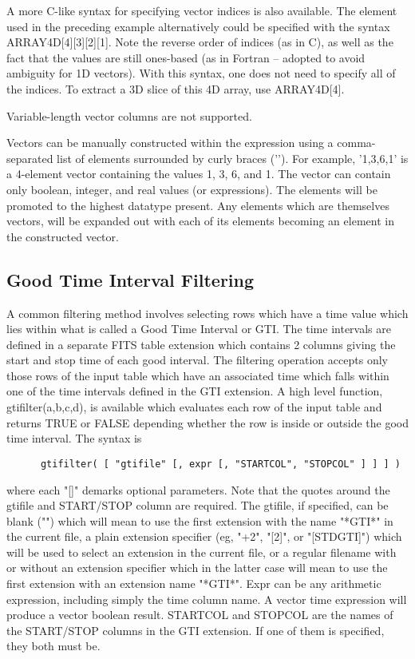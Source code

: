 \documentclass[11pt]{book}
\begin{document}
    A  more  C-like  syntax  for  specifying  vector  indices  is   also
    available.   The element used in the preceding example alternatively
    could be specified with the syntax  ARRAY4D[4][3][2][1].   Note  the
    reverse  order  of  indices  (as in C), as well as the fact that the
    values are still ones-based (as  in  Fortran  --  adopted  to  avoid
    ambiguity  for  1D vectors).  With this syntax, one does not need to
    specify all of the indices.  To  extract  a  3D  slice  of  this  4D
    array, use ARRAY4D[4].

    Variable-length vector columns are not supported.

    Vectors can  be manually constructed  within the expression  using a
    comma-separated list of  elements surrounded by curly braces ('{}').
    For example, '{1,3,6,1}' is a 4-element vector containing the values
    1, 3, 6, and 1.  The  vector can contain  only boolean, integer, and
    real values (or expressions).  The elements will  be promoted to the
    highest  datatype   present.  Any   elements   which  are themselves
    vectors, will be expanded out with  each of its elements becoming an
    element in the constructed vector.


\subsection{Good Time Interval Filtering}

    A common filtering method involves selecting rows which have a time
    value which lies within what is called a Good Time Interval or GTI.
    The time intervals are defined in a separate FITS table extension
    which contains 2 columns giving the start and stop time of each
    good interval.  The filtering operation accepts only those rows of
    the input table which have an associated time which falls within
    one of the time intervals defined in the GTI extension. A high
    level function, gtifilter(a,b,c,d), is available which evaluates
    each row of the input table  and returns TRUE  or FALSE depending
    whether the row is inside or outside the  good time interval.  The
    syntax is

\begin{verbatim}
      gtifilter( [ "gtifile" [, expr [, "STARTCOL", "STOPCOL" ] ] ] )
\end{verbatim}
    where  each "[]" demarks optional parameters.  Note that  the quotes
    around the gtifile and START/STOP column are required.  The gtifile,
    if specified,  can be blank  ("") which will  mean to use  the first
    extension  with   the name "*GTI*"  in   the current  file,  a plain
    extension  specifier (eg, "+2",  "[2]", or "[STDGTI]") which will be
    used  to  select  an extension  in  the current  file, or  a regular
    filename with or without an extension  specifier which in the latter
    case  will mean to  use the first  extension  with an extension name
    "*GTI*".  Expr can be   any arithmetic expression, including  simply
    the time  column  name.  A  vector  time expression  will  produce a
    vector boolean  result.  STARTCOL and  STOPCOL are the  names of the
    START/STOP   columns in the    GTI extension.  If   one  of them  is
    specified, they both  must be.
\end{document}
